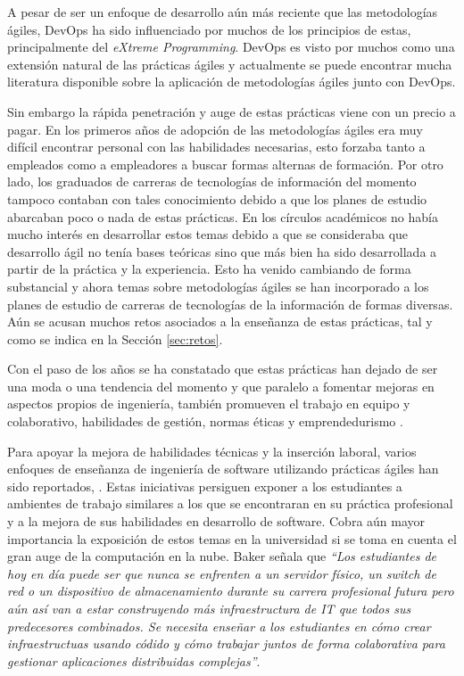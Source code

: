 A pesar de ser un enfoque de desarrollo aún más reciente que las metodologías ágiles, DevOps ha sido influenciado por muchos de los principios de estas, principalmente del \emph{eXtreme Programming}. DevOps es visto por muchos como una extensión natural de las prácticas ágiles\cite{henrik-b} y actualmente se puede encontrar mucha literatura disponible sobre la aplicación de metodologías ágiles junto con DevOps.

Sin embargo la rápida penetración y auge de estas prácticas viene con un precio a pagar. En los primeros años de adopción de las metodologías ágiles era muy difícil encontrar personal con las habilidades necesarias, esto forzaba tanto a empleados como a empleadores a buscar formas alternas de formación. Por otro lado, los graduados de carreras de tecnologías de información del momento tampoco contaban con tales conocimiento debido a que los planes de estudio abarcaban poco o nada de estas prácticas. En los círculos académicos no había mucho interés en desarrollar estos temas debido a que se consideraba que desarrollo ágil no tenía bases teóricas sino que más bien ha sido desarrollada a partir de la práctica y la experiencia\cite{hazzan-dubinsky}. Esto ha venido cambiando de forma substancial y ahora temas sobre metodologías ágiles se han incorporado a los planes de estudio de carreras de tecnologías de la información de formas diversas. Aún se acusan muchos retos asociados a la enseñanza de estas prácticas, tal y como se indica en la Sección \ref{sec:retos}.

Con el paso de los años se ha constatado que estas prácticas han dejado de ser una moda o una tendencia del momento y que paralelo a fomentar mejoras en aspectos propios de ingeniería, también promueven el trabajo en equipo y colaborativo, habilidades de gestión, normas éticas y emprendedurismo \cite{hazzan-dubinsky, hickey-salas}. 

Para apoyar la mejora de habilidades técnicas y la inserción laboral, varios enfoques de enseñanza de ingeniería de software utilizando prácticas ágiles han sido reportados, \cite{ding-yousef-yue, steghoger-et-al, scharlau, schroeder-et-al, cubric, haaranen-lehtinen, kropp-meier-2}. Estas iniciativas persiguen exponer a los estudiantes a ambientes de trabajo similares a los que se encontraran en su práctica profesional y a la mejora de sus habilidades en desarrollo de software. Cobra aún mayor importancia la exposición de estos temas en la universidad si se toma en cuenta el gran auge de la computación en la nube. Baker \cite{advance-it} señala que \emph{``Los estudiantes de hoy en día puede ser que nunca se enfrenten a un servidor físico, un switch de red o un dispositivo de almacenamiento durante su carrera profesional futura pero aún así van a estar construyendo más infraestructura de IT que todos sus predecesores combinados. Se necesita enseñar a los estudiantes en cómo crear infraestructuas usando códido y cómo trabajar juntos de forma colaborativa para gestionar aplicaciones distribuidas complejas''}. 


